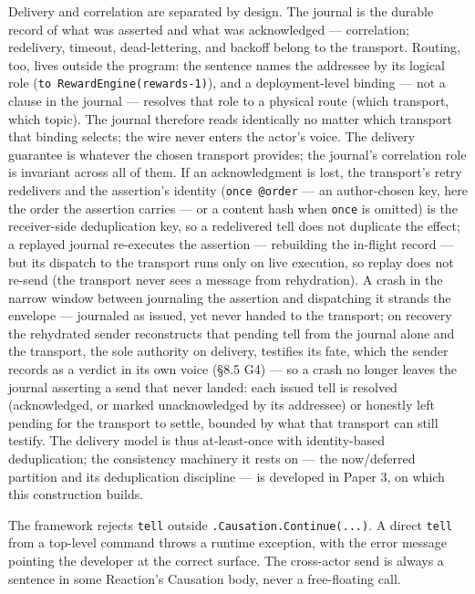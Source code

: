 \documentclass[
]{article}
\let\origtexttt\texttt%
\renewcommand{\texttt}[1]{\origtexttt{\seqsplit{#1}}}%
\let\texttt\origtexttt%
\begin{document}
Delivery and correlation are separated by design. The journal is the
durable record of what was asserted and what was acknowledged ---
correlation; redelivery, timeout, dead-lettering, and backoff belong to
the transport. Routing, too, lives outside the program: the sentence
names the addressee by its logical role
(\texttt{to\ RewardEngine(\textquotesingle{}rewards-1\textquotesingle{})}),
and a deployment-level binding --- not a clause in the journal ---
resolves that role to a physical route (which transport, which topic).
The journal therefore reads identically no matter which transport that
binding selects; the wire never enters the actor's voice. The delivery
guarantee is whatever the chosen transport provides; the journal's
correlation role is invariant across all of them. If an acknowledgment
is lost, the transport's retry redelivers and the assertion's identity
(\texttt{once\ @order} --- an author-chosen key, here the order the
assertion carries --- or a content hash when \texttt{once} is omitted)
is the receiver-side deduplication key, so a redelivered tell does not
duplicate the effect; a replayed journal re-executes the assertion ---
rebuilding the in-flight record --- but its dispatch to the transport
runs only on live execution, so replay does not re-send (the transport
never sees a message from rehydration). A crash in the narrow window
between journaling the assertion and dispatching it strands the envelope
--- journaled as issued, yet never handed to the transport; on recovery
the rehydrated sender reconstructs that pending tell from the journal
alone and the transport, the sole authority on delivery, testifies its
fate, which the sender records as a verdict in its own voice (§8.5 G4)
--- so a crash no longer leaves the journal asserting a send that never
landed: each issued tell is resolved (acknowledged, or marked
unacknowledged by its addressee) or honestly left pending for the
transport to settle, bounded by what that transport can still testify.
The delivery model is thus at-least-once with identity-based
deduplication; the consistency machinery it rests on --- the
now/deferred partition and its deduplication discipline --- is developed
in Paper 3, on which this construction builds.

The framework rejects \texttt{tell} outside
\texttt{.Causation.Continue(...)}. A direct \texttt{tell} from a
top-level command throws a runtime exception, with the error message
pointing the developer at the correct surface. The cross-actor send is
always a sentence in some Reaction's Causation body, never a
free-floating call.
\end{document}
